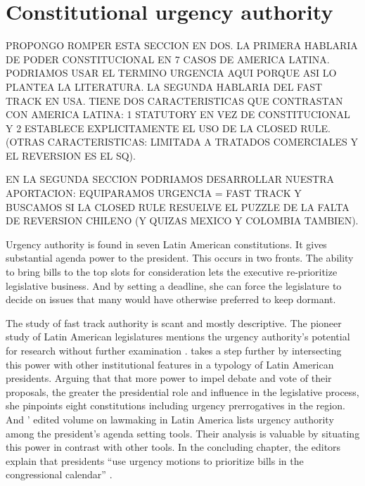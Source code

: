 \section{Constitutional urgency authority}

PROPONGO ROMPER ESTA SECCION EN DOS. LA PRIMERA HABLARIA DE PODER CONSTITUCIONAL EN 7 CASOS DE AMERICA LATINA. PODRIAMOS USAR EL TERMINO URGENCIA AQUI PORQUE ASI LO PLANTEA LA LITERATURA. LA SEGUNDA HABLARIA DEL FAST TRACK EN USA. TIENE DOS CARACTERISTICAS QUE CONTRASTAN CON AMERICA LATINA: 1 STATUTORY EN VEZ DE CONSTITUCIONAL Y 2 ESTABLECE EXPLICITAMENTE EL USO DE LA CLOSED RULE. (OTRAS CARACTERISTICAS: LIMITADA A TRATADOS COMERCIALES Y EL REVERSION ES EL SQ).

EN LA SEGUNDA SECCION PODRIAMOS DESARROLLAR NUESTRA APORTACION: EQUIPARAMOS URGENCIA = FAST TRACK Y BUSCAMOS SI LA CLOSED RULE RESUELVE EL PUZZLE DE LA FALTA DE REVERSION CHILENO (Y QUIZAS MEXICO Y COLOMBIA TAMBIEN).

Urgency authority is found in seven Latin American constitutions. It gives substantial agenda power to the president. This occurs in two fronts. The ability to bring bills to the top slots for consideration lets the executive re-prioritize legislative business. And by setting a deadline, she can force the legislature to decide on issues that many would have otherwise preferred to keep dormant.

The study of fast track authority is scant and mostly descriptive. The pioneer study of Latin American legislatures mentions the urgency authority's potential for research without further examination \citep{morgenstern.2002b}. \citet{garcia.montero.presidentes.2009} takes a step further by intersecting this power with other institutional features in a typology of Latin American presidents. Arguing that that more power to impel debate and vote of their proposals, the greater the presidential role and influence in the legislative process, she pinpoints eight constitutions including urgency prerrogatives in the region. And \citeauthor{aleman-tsebelis-2016-book}' \citeyearpar{aleman-tsebelis-2016-book} edited volume on lawmaking in Latin America lists urgency authority among the president's agenda setting tools. Their analysis is valuable by situating this power in contrast with other tools. In the concluding chapter, the editors explain that presidents ``use urgency motions to prioritize bills in the congressional calendar'' \citep[][:229]{aleman-tsebelis-2016-chapter}. 

